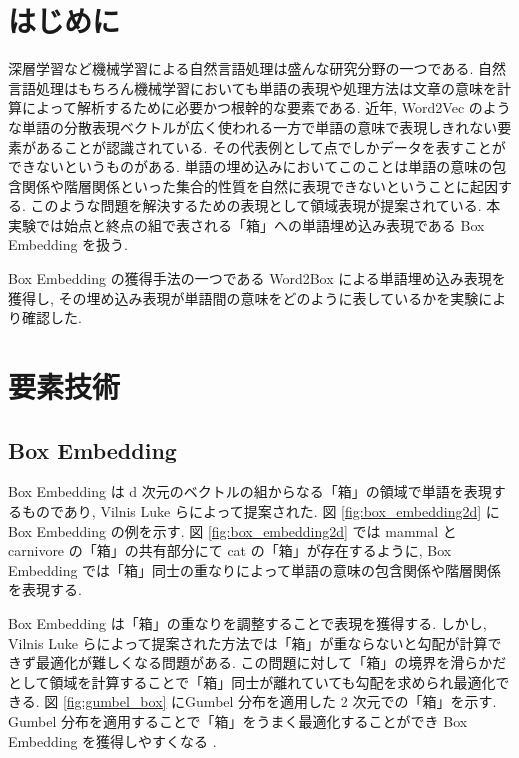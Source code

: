 \documentclass[twocolumn]{jarticle}     %
\begin{document}

\section{はじめに}
深層学習など機械学習による自然言語処理は盛んな研究分野の一つである. 
自然言語処理はもちろん機械学習においても単語の表現や処理方法は文章の意味を計算によって解析するために必要かつ根幹的な要素である.
近年, Word2Vec のような単語の分散表現ベクトルが広く使われる一方で単語の意味で表現しきれない要素があることが認識されている. 
その代表例として点でしかデータを表すことができないというものがある. 
単語の埋め込みにおいてこのことは単語の意味の包含関係や階層関係といった集合的性質を自然に表現できないということに起因する. 
このような問題を解決するための表現として領域表現が提案されている. 
本実験では始点と終点の組で表される「箱」への単語埋め込み表現である Box Embedding を扱う. 

Box Embedding の獲得手法の一つである Word2Box による単語埋め込み表現を獲得し, その埋め込み表現が単語間の意味をどのように表しているかを実験により確認した. 

\section{要素技術}
\subsection{Box Embedding}
Box Embedding は d 次元のベクトルの組からなる「箱」の領域で単語を表現するものであり, Vilnis Luke ら\cite{box-lattice}によって提案された. 
図 \ref{fig:box_embedding2d} に Box Embedding の例を示す. 
図 \ref{fig:box_embedding2d} では mammal と carnivore の「箱」の共有部分にて cat の「箱」が存在するように, Box Embedding では「箱」同士の重なりによって単語の意味の包含関係や階層関係を表現する. 

Box Embedding は「箱」の重なりを調整することで表現を獲得する. しかし, Vilnis Luke らによって提案された方法では「箱」が重ならないと勾配が計算できず最適化が難しくなる問題がある.
この問題に対して「箱」の境界を滑らかだとして領域を計算することで「箱」同士が離れていても勾配を求められ最適化できる. 
図 \ref{fig:gumbel_box} にGumbel 分布を適用した 2 次元での「箱」を示す. 
Gumbel 分布を適用することで「箱」をうまく最適化することができ Box Embedding を獲得しやすくなる \cite{gumbel-box}. 
\end{document}
